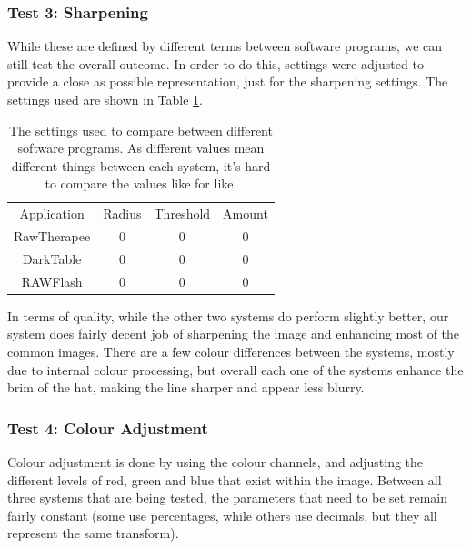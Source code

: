 \documentclass[11pt,a4paper]{article}
\begin{document}

\subsubsection{Test 3: Sharpening}
While these are defined by different terms between software programs, we can still test the overall outcome.
In order to do this, settings were adjusted to provide a close as possible representation, just for the
sharpening settings. The settings used are shown in Table \ref{SharpeningSettings}. 

\begin{table}\label{SharpeningSettings}
    \centering
    \begin{tabular}{| c | c | c | c |}
        \hline
        Application & Radius & Threshold & Amount\\
        RawTherapee & 0 & 0 & 0\\
        DarkTable & 0 & 0 & 0\\
        RAWFlash & 0 & 0 & 0\\
        \hline
    \end{tabular}
    \caption{The settings used to compare between different software programs. As different values mean different things
    between each system, it's hard to compare the values like for like.}
\end{table}

In terms of quality, while the other two systems do perform slightly better, our system does fairly decent job of sharpening
the image and enhancing most of the common images. There are a few colour differences between the systems, mostly due to internal
colour processing, but overall each one of the systems enhance the brim of the hat, making the line sharper and appear less blurry. 


\subsubsection{Test 4: Colour Adjustment}
Colour adjustment is done by using the colour channels, and adjusting the different levels of red, green and blue that exist within the image.
Between all three systems that are being tested, the parameters that need to be set remain fairly constant (some use percentages, while others use decimals,
but they all represent the same transform).

\end{document}
